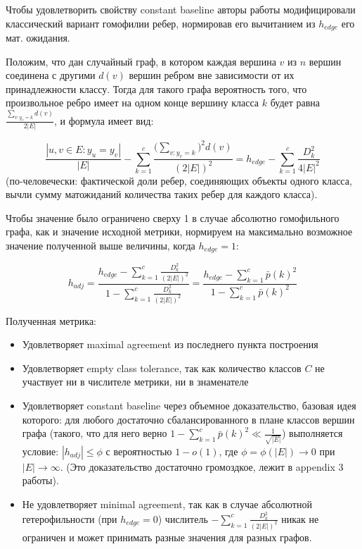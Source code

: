 \documentclass[a4paper,14pt]{article}
\begin{document}
	Чтобы удовлетворить свойству constant baseline авторы работы модифицировали классический вариант гомофилии ребер, нормировав его вычитанием из $ h_{edge} $ его мат. ожидания.
	
	Положим, что дан случайный граф, в котором каждая вершина $v$ из $n$ вершин соединена с другими $d(v)$ вершин ребром вне зависимости от их принадлежности классу.
	Тогда для такого графа вероятность того, что произвольное ребро имеет на одном конце вершину класса $k$ будет равна $ \frac{\sum_{v: y_v = k} d(v)}{2|E|} $, и формула имеет вид:
	
	$$ \frac{ |{u, v} \in E: y_u = y_v| }{ |E| } - \sum_{k=1}^{c} \frac{\bigl( \sum_{v: y_v = k} \bigr)^2 d(v)}{(2|E|)^2} = h_{edge} - \sum_{k=1}^{c} \frac{D_k^2}{4|E|^2} $$ (по-человечески: фактической доли ребер, соединяющих объекты одного класса, вычли сумму матожиданий количества таких ребер для каждого класса).
	
	Чтобы значение было ограничено сверху 1 в случае абсолютно гомофильного графа, как и значение исходной метрики, нормируем на максимально возможное значение полученной выше величины, когда $ h_{edge} = 1 $:
	
	$$ h_{adj} = \frac{ h_{edge} - \sum_{k=1}^{c} \frac{D_k^2}{(2|E|)^2} }{ 1 - \sum_{k=1}^{c} \frac{D_k^2}{(2|E|)^2}} = \frac{ h_{edge} - \sum_{k=1}^{c} \bar{p}(k)^2 }{1 - \sum_{k=1}^{c} \bar{p}(k)^2 } $$
	
	Полученная метрика:
	
	\begin{itemize}
	
		\item Удовлетворяет maximal agreement из последнего пункта построения
		
		\item Удовлетворяет empty class tolerance, так как количество классов $C$ не участвует ни в числителе метрики, ни в знаменателе
		
		\item Удовлетворяет constant baseline через объемное доказательство, базовая идея которого: для любого достаточно сбалансированного в плане классов вершин графа (такого, что для него верно $ 1 - \sum_{k=1}^{c} \bar{p}(k)^2 \ll \frac{1}{\sqrt{|E|}} $) выполняется условие: $|h_{adj}| \leq \phi$ с вероятностью $1 - o(1)$, где $\phi = \phi (|E|) \rightarrow 0 $ при $|E| \rightarrow \infty$.
		(Это доказательство достаточно громоздкое, лежит в appendix 3 работы).
		
		\item Не удовлетворяет minimal agreement, так как в случае абсолютной гетерофильности (при $ h_{edge} = 0 $) числитель $ - \sum_{k=1}^{c} \frac{D_k^2}{(2|E|)^2} $ никак не ограничен и может принимать разные значения для разных графов.
		
	\end{itemize}
\end{document}
